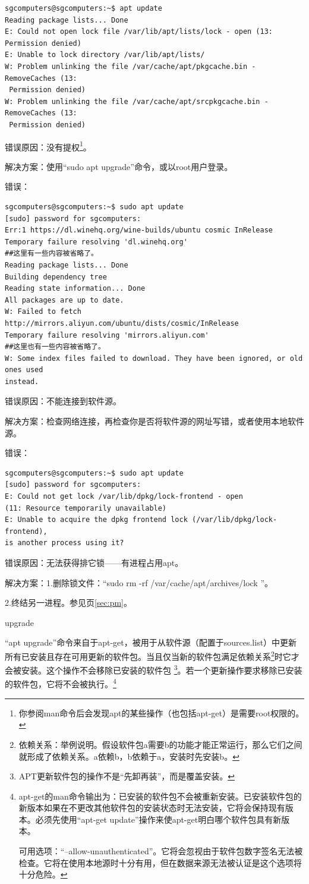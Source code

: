 \documentclass{book}
\begin{document}
\begin{verbatim}
sgcomputers@sgcomputers:~$ apt update
Reading package lists... Done
E: Could not open lock file /var/lib/apt/lists/lock - open (13: Permission denied)
E: Unable to lock directory /var/lib/apt/lists/
W: Problem unlinking the file /var/cache/apt/pkgcache.bin - RemoveCaches (13:
 Permission denied)
W: Problem unlinking the file /var/cache/apt/srcpkgcache.bin - RemoveCaches (13:
 Permission denied)
\end{verbatim}
错误原因：没有提权\footnote{你参阅man命令后会发现apt的某些操作（也包括apt-get）是需要root权限的。}。  \par
解决方案：使用“sudo apt upgrade”命令，或以root用户登录。  \par
\large 错误：\normalsize \par
\begin{verbatim}
sgcomputers@sgcomputers:~$ sudo apt update
[sudo] password for sgcomputers:
Err:1 https://dl.winehq.org/wine-builds/ubuntu cosmic InRelease
Temporary failure resolving 'dl.winehq.org'
##这里有一些内容被省略了。
Reading package lists... Done
Building dependency tree
Reading state information... Done
All packages are up to date.
W: Failed to fetch http://mirrors.aliyun.com/ubuntu/dists/cosmic/InRelease
Temporary failure resolving 'mirrors.aliyun.com'
##这里也有一些内容被省略了。
W: Some index files failed to download. They have been ignored, or old ones used
instead.
\end{verbatim}
错误原因：不能连接到软件源。 \par
解决方案：检查网络连接，再检查你是否将软件源的网址写错，或者使用本地软件源。 \par
\large 错误：\normalsize \par
\begin{verbatim}
sgcomputers@sgcomputers:~$ sudo apt update
[sudo] password for sgcomputers:
E: Could not get lock /var/lib/dpkg/lock-frontend - open 
(11: Resource temporarily unavailable)
E: Unable to acquire the dpkg frontend lock (/var/lib/dpkg/lock-frontend), 
is another process using it?
\end{verbatim}
错误原因：无法获得排它锁——有进程占用apt。\par
解决方案：1.删除锁文件：“sudo rm -rf /var/cache/apt/archives/lock ”。\par
2.终结另一进程。参见\pageref{sec:pm}页\ref{sec:pm}。
\begin{center} upgrade \end{center}
“apt upgrade”命令来自于apt-get，被用于从软件源（配置于sources.list）中更新所有已安装且存在可用更新的软件包。当且仅当新的软件包满足依赖关系\footnote{依赖关系：举例说明。假设软件包a需要b的功能才能正常运行，那么它们之间就形成了依赖关系。a依赖b，b依赖于a，安装时先安装b。}时它才会被安装。这个操作不会移除已安装的软件包 \footnote{APT更新软件包的操作不是“先卸再装”，而是覆盖安装。}。若一个更新操作要求移除已安装的软件包，它将不会被执行。\footnote{apt-get的man命令输出为：已安装的软件包不会被重新安装。已安装软件包的新版本如果在不更改其他软件包的安装状态时无法安装，它将会保持现有版本。必须先使用“apt-get update”操作来使apt-get明白哪个软件包具有新版本。\par
可用选项：“--allow-unauthenticated”。它将会忽视由于软件包数字签名无法被检查。它将在使用本地源时十分有用，但在数据来源无法被认证是这个选项将十分危险。}
\end{document}
